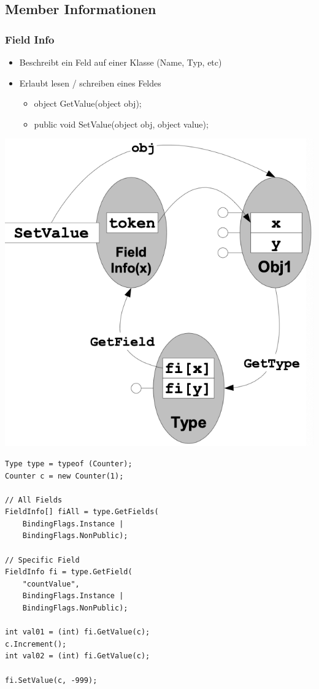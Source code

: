 \subsection{Member Informationen}
\subsubsection{Field Info}
\begin{itemize}
    \item Beschreibt ein Feld auf einer Klasse (Name, Typ, etc)
    \item Erlaubt lesen / schreiben eines Feldes
    \begin{itemize}
        \item object GetValue(object obj);
        \item public void SetValue(object obj, object value);
    \end{itemize}
\end{itemize}
\vspace{-8pt}
\begin{center}
    \includegraphics[scale=.3]{graphic/ref attr/field info.png}
\end{center}
\vspace{-8pt}
\begin{lstlisting}
Type type = typeof (Counter);
Counter c = new Counter(1);

// All Fields
FieldInfo[] fiAll = type.GetFields(
    BindingFlags.Instance |
    BindingFlags.NonPublic);

// Specific Field
FieldInfo fi = type.GetField(
    "countValue",
    BindingFlags.Instance |
    BindingFlags.NonPublic);

int val01 = (int) fi.GetValue(c);
c.Increment();
int val02 = (int) fi.GetValue(c);

fi.SetValue(c, -999);
\end{lstlisting}

